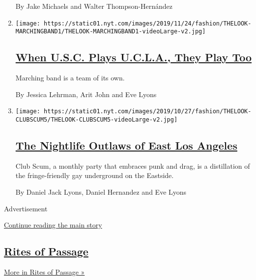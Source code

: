 \begin{enumerate}
  By Jake Michaels and Walter Thompson-Hernández
\item
  \texttt{[image: https://static01.nyt.com/images/2019/11/24/fashion/THELOOK-MARCHINGBAND1/THELOOK-MARCHINGBAND1-videoLarge-v2.jpg]}

  \hypertarget{when-usc-plays-ucla-they-play-too}{%
  \subsection{\texorpdfstring{\href{/2019/11/23/style/usc-ucla-marching-band.html}{When
  U.S.C. Plays U.C.L.A., They Play
  Too}}{When U.S.C. Plays U.C.L.A., They Play Too}}\label{when-usc-plays-ucla-they-play-too}}

  Marching band is a team of its own.

  By Jessica Lehrman, Arit John and Eve Lyons
\item
  \texttt{[image: https://static01.nyt.com/images/2019/10/27/fashion/THELOOK-CLUBSCUM5/THELOOK-CLUBSCUM5-videoLarge-v2.jpg]}

  \hypertarget{the-nightlife-outlaws-of-east-los-angeles}{%
  \subsection{\texorpdfstring{\href{/2019/10/19/style/the-nightlife-outlaws-of-east-los-angeles.html}{The
  Nightlife Outlaws of East Los
  Angeles}}{The Nightlife Outlaws of East Los Angeles}}\label{the-nightlife-outlaws-of-east-los-angeles}}

  Club Scum, a monthly party that embraces punk and drag, is a
  distillation of the fringe-friendly gay underground on the Eastside.

  By Daniel Jack Lyons, Daniel Hernandez and Eve Lyons
\end{enumerate}

Advertisement

\protect\hyperlink{after-mid6}{Continue reading the main story}

\hypertarget{rites-of-passage}{%
\subsection{\texorpdfstring{\href{/column/rites-of-passage}{Rites of
Passage}}{Rites of Passage}}\label{rites-of-passage}}

\href{/column/rites-of-passage}{More in Rites of Passage »}

